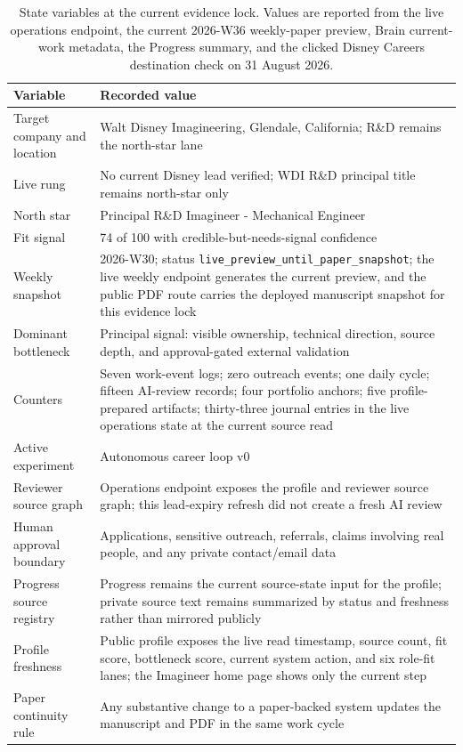 \documentclass[12pt,letterpaper]{article}
\begin{document}
\begin{table}[tbp]
\centering
\small
\caption{State variables at the current evidence lock. Values are reported from the live operations endpoint, the current 2026-W36 weekly-paper preview, Brain current-work metadata, the Progress summary, and the clicked Disney Careers destination check on 31 August 2026.}
\label{tab:state}
\begin{tabularx}{\textwidth}{L{0.30\textwidth}Y}
\toprule
{}
\textbf{Variable} & \textbf{Recorded value} \\
\midrule
Target company and location & Walt Disney Imagineering, Glendale, California; R\&D remains the north-star lane \\
Live rung & No current Disney lead verified; WDI R\&D principal title remains north-star only \\
North star & Principal R\&D Imagineer - Mechanical Engineer \\
Fit signal & 74 of 100 with credible-but-needs-signal confidence \\
Weekly snapshot & 2026-W30; status \texttt{live\_preview\_until\_paper\_snapshot}; the live weekly endpoint generates the current preview, and the public PDF route carries the deployed manuscript snapshot for this evidence lock \\
Dominant bottleneck & Principal signal: visible ownership, technical direction, source depth, and approval-gated external validation \\
Counters & Seven work-event logs; zero outreach events; one daily cycle; fifteen AI-review records; four portfolio anchors; five profile-prepared artifacts; thirty-three journal entries in the live operations state at the current source read \\
Active experiment & Autonomous career loop v0 \\
Reviewer source graph & Operations endpoint exposes the profile and reviewer source graph; this lead-expiry refresh did not create a fresh AI review \\
Human approval boundary & Applications, sensitive outreach, referrals, claims involving real people, and any private contact/email data \\
Progress source registry & Progress remains the current source-state input for the profile; private source text remains summarized by status and freshness rather than mirrored publicly \\
Profile freshness & Public profile exposes the live read timestamp, source count, fit score, bottleneck score, current system action, and six role-fit lanes; the Imagineer home page shows only the current step \\
Paper continuity rule & Any substantive change to a paper-backed system updates the manuscript and PDF in the same work cycle \\
\bottomrule
\end{tabularx}
\end{table}
\end{document}
